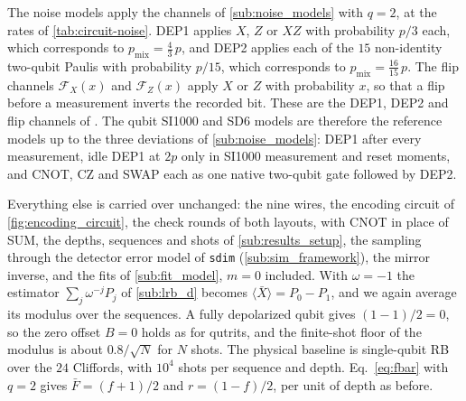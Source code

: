 The noise models apply the channels of \autoref{sub:noise_models} with $q = 2$, at the rates of \autoref{tab:circuit-noise}. DEP1 applies $X$, $Z$ or $XZ$ with probability $p/3$ each, which corresponds to $p_{\mathrm{mix}} = \tfrac{4}{3}\,p$, and DEP2 applies each of the $15$ non-identity two-qubit Paulis with probability $p/15$, which corresponds to $p_{\mathrm{mix}} = \tfrac{16}{15}\,p$. The flip channels $\mathcal{F}_X(x)$ and $\mathcal{F}_Z(x)$ apply $X$ or $Z$ with probability $x$, so that a flip before a measurement inverts the recorded bit. These are the DEP1, DEP2 and flip channels of \cite{GidneyHoneycomb2021}. The qubit SI1000 and SD6 models are therefore the reference models up to the three deviations of \autoref{sub:noise_models}: DEP1 after every measurement, idle DEP1 at $2p$ only in SI1000 measurement and reset moments, and CNOT, CZ and SWAP each as one native two-qubit gate followed by DEP2.

Everything else is carried over unchanged: the nine wires, the encoding circuit of \autoref{fig:encoding_circuit}, the check rounds of both layouts, with CNOT in place of SUM, the depths, sequences and shots of \autoref{sub:results_setup}, the sampling through the detector error model of \texttt{sdim} (\autoref{sub:sim_framework}), the mirror inverse, and the fits of \autoref{sub:fit_model}, $m = 0$ included. With $\omega = -1$ the estimator $\sum_j \omega^{-j} P_j$ of \autoref{sub:lrb_d} becomes $\langle \bar X \rangle = P_0 - P_1$, and we again average its modulus over the sequences. A fully depolarized qubit gives $(1 - 1)/2 = 0$, so the zero offset $B = 0$ holds as for qutrits, and the finite-shot floor of the modulus is about $0.8/\sqrt{N}$ for $N$ shots. The physical baseline is single-qubit RB over the $24$ Cliffords, with $10^4$ shots per sequence and depth. Eq.~\eqref{eq:fbar} with $q = 2$ gives $\bar F = (f + 1)/2$ and $r = (1 - f)/2$, per unit of depth as before.

